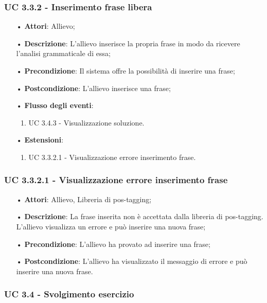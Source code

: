 \subsubsection{UC 3.3.2 - Inserimento frase libera}
\begin{itemize}
\item[•]\textbf{Attori}: Allievo;
\item[•]\textbf{Descrizione}: L'allievo inserisce la propria frase in modo da ricevere l'analisi grammaticale di essa;
\item[•]\textbf{Precondizione}: Il sistema offre la possibilità di inserire una frase;
\item[•]\textbf{Postcondizione}: L'allievo inserisce una frase;
\item[•]\textbf{Flusso degli eventi}:
\begin{enumerate}
\item UC 3.4.3 - Visualizzazione soluzione. %
\end{enumerate}
\item[•]\textbf{Estensioni}:
\begin{enumerate}
\item UC 3.3.2.1 - Visualizzazione errore inserimento frase. %
\end{enumerate}
\end{itemize}


\subsubsection{UC 3.3.2.1 - Visualizzazione errore inserimento frase}
\begin{itemize}
\item[•]\textbf{Attori}: Allievo, Libreria di pos-tagging;
\item[•]\textbf{Descrizione}: La frase inserita non è accettata dalla libreria di pos-tagging. L'allievo visualizza un errore e può inserire una nuova frase;
\item[•]\textbf{Precondizione}: L'allievo ha provato ad inserire una frase;
\item[•]\textbf{Postcondizione}: L'allievo ha visualizzato il messaggio di errore e può inserire una nuova frase.
\end{itemize}

\subsubsection{UC 3.4 - Svolgimento esercizio}

